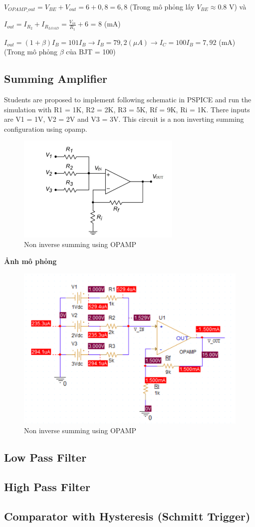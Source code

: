 $V_{OPAMP\_out} = V_{BE} + V_{out} = 6 + 0,8 = 6,8$ (Trong mô phỏng lấy $V_{BE} \approx 0.8$ V) và

$I_{out} = I_{R_2} + I_{R_{LOAD}} = \frac{V_{in}}{R_1} + 6$ = 8 (mA)

$I_{out} = (1+\beta)I_B  = 101I_B \rightarrow I_B = 79,2 (\mu A) \rightarrow I_C = 100I_B = 7,92$ (mA) (Trong mô phỏng $\beta$ của BJT = 100)
\pagebreak
\subsection{Summing Amplifier}
Students are proposed to implement following schematic in PSPICE and run the simulation with R1 = 1K, R2 = 2K, R3 = 5K, Rf = 9K, Ri = 1K. There inputs are V1 = 1V, V2 = 2V and
V3 = 3V. This circuit is a non inverting summing configuration using opamp.

\begin{figure}[ht]
    \centering
    \includegraphics[width=0.7\textwidth]{graphics/ex1/f9.png}
    \caption{Non inverse summing using OPAMP}
\end{figure}

\textbf{Ảnh mô phỏng}

\begin{figure}[ht]
    \centering
    \includegraphics[width=1\textwidth]{graphics/ex1/f11.png}
    \caption{Non inverse summing using OPAMP}
\end{figure}

\pagebreak
\subsection{Low Pass Filter}
\subsection{High Pass Filter}
\subsection{Comparator with Hysteresis (Schmitt Trigger)}
